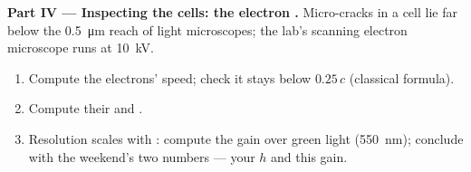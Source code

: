 \begin{problem}
\medskip
\noindent\textbf{Part IV --- Inspecting the cells: the electron .}
Micro-cracks in a cell lie far below the \qty{0.5}{\micro m} reach of light
microscopes; the lab's scanning electron microscope runs at \qty{10}{kV}.
\begin{enumerate}[resume]
  \item Compute the electrons' speed; check it stays below $0.25\,c$ (classical formula).
  \item Compute their  and .
  \item Resolution scales with : compute the gain over green light
        (\qty{550}{nm}); conclude with the weekend's two numbers --- your $h$
        and this gain.
\end{enumerate}
\end{problem}

